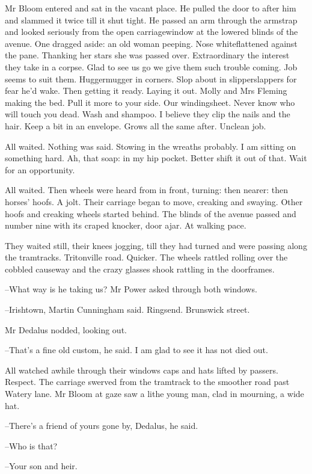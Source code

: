 Mr Bloom entered and sat in the vacant place.
He pulled the door to after him
and slammed it twice till it shut tight.
He passed an arm through the armstrap
and looked seriously from the open carriagewindow
at the lowered blinds of the avenue.
One dragged aside:
an old woman peeping.
Nose whiteflattened against the pane.
Thanking her stars she was passed over.
Extraordinary the interest they take in a corpse.
Glad to see us go
we give them such trouble coming.
Job seems to suit them.
Huggermugger in corners.
Slop about in slipperslappers for fear he'd wake.
Then getting it ready.
Laying it out.
Molly and Mrs Fleming making the bed.
Pull it more to your side.
Our windingsheet.
Never know who will touch you dead.
Wash and shampoo.
I believe they clip the nails and the hair.
Keep a bit in an envelope.
Grows all the same after.
Unclean job.

All waited.
Nothing was said.
Stowing in the wreaths probably.
I am sitting on something hard.
Ah, that soap:
in my hip pocket.
Better shift it out of that.
Wait for an opportunity.

All waited.
Then wheels were heard from in front, turning:
then nearer:
then horses' hoofs.
A jolt.
Their carriage began to move, creaking and swaying.
Other hoofs and creaking wheels started behind.
The blinds of the avenue passed
and number nine with its craped knocker, door ajar.
At walking pace.

They waited still, their knees jogging, till they had turned
and were passing along the tramtracks.
Tritonville road.
Quicker.
The wheels
rattled rolling over the cobbled causeway
and the crazy glasses shook rattling in the doorframes.

--What way is he taking us?
Mr Power asked through both windows.

--Irishtown,
Martin Cunningham said.
Ringsend.
Brunswick street.

Mr Dedalus nodded, looking out.

--That's a fine old custom,
he said.
I am glad to see it has not died out.

All watched awhile through their windows
caps and hats lifted by passers.
Respect.
The carriage swerved from the tramtrack to the smoother road past Watery lane.
Mr Bloom at gaze saw a lithe young man,
clad in mourning, a wide hat.

--There's a friend of yours gone by, Dedalus,
he said.

--Who is that?

--Your son and heir.


